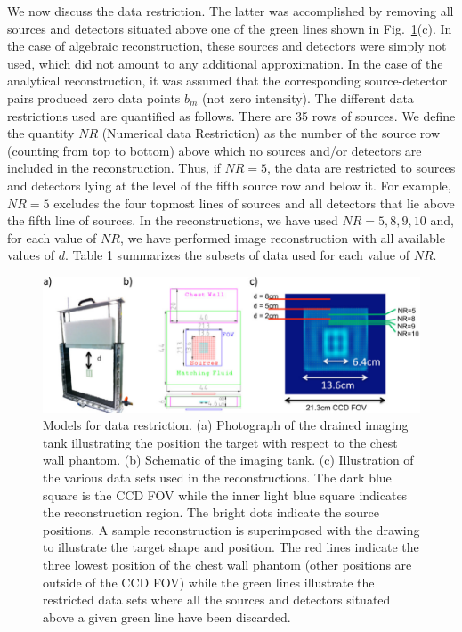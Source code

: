 We now discuss the data restriction. The latter was accomplished by removing all sources and detectors situated above one of the green lines shown in Fig.~\ref{fig:data}(c). In the case of algebraic reconstruction, these sources and detectors were simply not used, which did not amount to any additional approximation. In the case of the analytical reconstruction, it was assumed that the corresponding source-detector pairs produced zero data points $b_m$ (not zero intensity). The different data restrictions used are quantified as follows. There are 35 rows of sources. We define the quantity $NR$ (Numerical data Restriction) as the number of the source row (counting from top to bottom) above which no sources and/or detectors are included in the reconstruction.  Thus, if $NR=5$, the data are restricted to sources and detectors lying at the level of the fifth source row and below it. For example, $NR=5$ excludes the four topmost lines of sources and all detectors that lie above the fifth line of sources. In the reconstructions, we have used $NR=5, 8, 9, 10$ and, for each value of $NR$, we have performed image reconstruction with all available values of $d$. Table 1 summarizes the subsets of data
used for each value of $NR$.

\begin{figure}[htbp]
\centering\includegraphics[width=\textwidth]{./figures/chestwall_3.pdf}
\caption{\label{fig:data}
  Models for data restriction. (a) Photograph of the drained imaging
  tank illustrating the position the target with respect to the chest
  wall phantom. (b) Schematic of the imaging tank. (c) Illustration of
  the various data sets used in the reconstructions. The dark blue
  square is the CCD FOV while the inner light blue square indicates
  the reconstruction region. The bright dots indicate the source
  positions. A sample reconstruction is superimposed with the drawing
  to illustrate the target shape and position. The red lines indicate
  the three lowest position of the chest wall phantom (other positions
  are outside of the CCD FOV) while the green lines illustrate the
  restricted data sets where all the sources and detectors situated
  above a given green line have been discarded.}
\end{figure}

